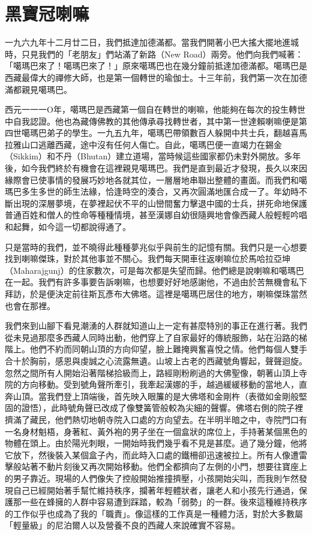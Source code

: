 \chapter{黑寶冠喇嘛}

一九六九年十二月廿二日，我們抵達加德滿都。當我們開著小巴大搖大擺地進城時，只見我們的「老朋友」們站滿了新路（New
Road）兩旁。他們向我們喊著：「噶瑪巴來了！噶瑪巴來了！」原來噶瑪巴也在幾分鐘前抵達加德滿都。噶瑪巴是西藏最偉大的禪修大師，也是第一個轉世的瑜伽士。十三年前，我們第一次在加德滿都親見噶瑪巴。

西元一一一Ο年，噶瑪巴是西藏第一個自在轉世的喇嘛，他能夠在每次的投生轉世中自我認證。他也為藏傳佛教的其他傳承尋找轉世者，其中第一世達賴喇嘛便是第四世噶瑪巴弟子的學生。一九五九年，噶瑪巴帶領數百人躲開中共士兵，翻越喜馬拉雅山口逃離西藏，途中沒有任何人傷亡。自此，噶瑪巴便一直竭力在錫金（Sikkim）和不丹（Bhutan）建立道場，當時候這些國家都仍未對外開放。多年後，如今我們終於有機會在這裡親見噶瑪巴。我們是直到最近才發現，長久以來因緣際會已使事情的發展巧妙地各就其位，一層層地串聯出整體的畫面。而我們和噶瑪巴多生多世的師生法緣，恰逢時空的湊合，又再次圓滿地匯合成一了。年幼時不斷出現的深層夢境，在夢裡起伏不平的山巒間奮力擊退中國的士兵，拼死命地保護普通百姓和僧人的性命等種種情境，甚至漢娜自幼很隨興地會像西藏人般輕輕吟唱和起舞，如今這一切都說得通了。

只是當時的我們，並不曉得此種種夢兆似乎與前生的記憶有關。我們只是一心想要找到喇嘛傑珠，對於其他事並不關心。我們每天開車往返喇嘛位於馬哈拉亞坤（Maharajgunj）的住家數次，可是每次都是失望而歸。他們總是說喇嘛和噶瑪巴在一起。我們有許多事要告訴喇嘛，也想要好好地感謝他，不過由於苦無機會私下拜訪，於是便決定前往斯瓦彥布大佛塔。這裡是噶瑪巴居住的地方，喇嘛傑珠當然也會在那裡。

我們來到山腳下看見潮湧的人群就知道山上一定有甚麼特別的事正在進行著。我們從未見過那麼多西藏人同時出動，他們穿上了自家最好的傳統服飾，站在沿路的梯階上。他們不約而同朝山頂的方向仰望，臉上難掩興奮喜悅之情。他們每個人雙手合十於胸前，感恩與虔誠之心流露無遺。山坡上古老的西藏號角響起，聲聲迴旋。忽然之間所有人開始沿著階梯拾級而上，路經剛粉刷過的大佛聖像，朝著山頂上寺院的方向移動。受到號角聲所牽引，我牽起漢娜的手，越過緩緩移動的當地人，直奔山頂。當我們登上頂端後，首先映入眼簾的是大佛塔和金剛杵（表徵如金剛般堅固的證悟），此時號角聲已改成了像雙簧管般較為尖細的聲響。佛塔右側的院子裡擠滿了藏民，他們熱切地朝寺院入口處的方向望去。在半明半暗之中，寺院門口有一名身材魁梧，身著紅、黃外袍的男子坐在一個盒狀的席位上，手持著某個黑色的物體在頭上。由於陽光刺眼，一開始時我們幾乎看不見是甚麼。過了幾分鐘，他將它放下，然後裝入某個盒子內，而此時入口處的鐵柵卻迅速被拉上。所有人像遭雷擊般站著不動片刻後又再次開始移動。他們全都擠向了左側的小門，想要往寶座上的男子靠近。現場的人們像失了控般開始推撞擠壓，小孩開始尖叫，而我則乍然發現自己已經開始著手幫忙維持秩序，攔著年輕體狀者，讓老人和小孩先行通過，保護那一些在蜂擁的人群中容易遭到踩踏，較為「弱勢」的一群。後來這種維持秩序的工作似乎也成為了我的「職責」。像這樣的工作真是一種體力活，對於大多數屬「輕量級」的尼泊爾人以及營養不良的西藏人來說確實不容易。

